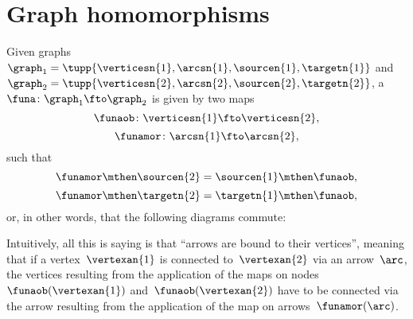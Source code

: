 
\section{Graph homomorphisms}
\begin{ctdefinition}
    \label{def:graph-homomorphism}
    Given graphs~$\graph_1=\tupp{\verticesn{1},\arcsn{1},\sourcen{1},\targetn{1}}$ and~$\graph_2=\tupp{\verticesn{2},\arcsn{2},\sourcen{2},\targetn{2}}$, a ~$\funa \colon \graph_1 \fto \graph_2$ is given by two maps~
    \begin{equation}
        \funaob\colon \verticesn{1} \fto \verticesn{2},
    \end{equation}
    \begin{equation}
        \funamor\colon \arcsn{1} \fto \arcsn{2},
    \end{equation}
    such that
    \begin{equation}
        \funamor \mthen \sourcen{2} = \sourcen{1}\mthen \funaob,
    \end{equation}
    \begin{equation}
        \funamor \mthen \targetn{2} = \targetn{1}\mthen \funaob,
    \end{equation}
    or, in other words, that the following diagrams commute:
    \begin{center}
    \end{center}
\end{ctdefinition}

\begin{remark}
    Intuitively, all this is saying is that ``arrows are bound to their vertices'', meaning that if a vertex~$\vertexan{1}$ is connected to~$\vertexan{2}$ via an arrow~$\arc$, the vertices resulting from the application of the maps on nodes~$\funaob(\vertexan{1})$ and~$\funaob(\vertexan{2})$ have to be connected via the arrow resulting from the application of the map on arrows~$\funamor(\arc)$.
\end{remark}

